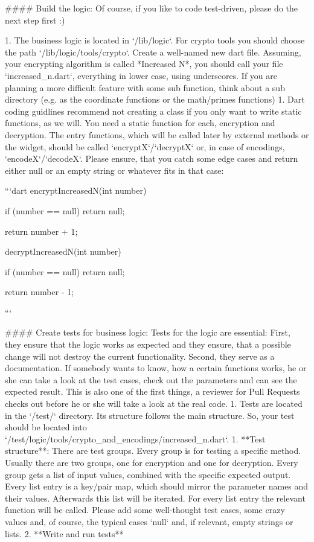 #### Build the logic:
Of course, if you like to code test-driven, please do the next step first :)

1. The business logic is located in `/lib/logic`. For crypto tools you should choose the path `/lib/logic/tools/crypto`. Create a well-named new dart file. Assuming, your encrypting algorithm is called *Increased N*, you should call your file `increased_n.dart`, everything in lower case, using underscores. If you are planning a more difficult feature with some sub function, think about a sub directory (e.g. as the coordinate functions or the math/primes functions) 
1. Dart coding guidlines recommend not creating a class if you only want to write static functions, as we will. You need a static function for each, encryption and decryption. The entry functions, which will be called later by external methods or the widget, should be called `encryptX`/`decryptX` or, in case of encodings, `encodeX`/`decodeX`. Please ensure, that you catch some edge cases and return either null or an empty string or whatever fits in that case:

```dart
encryptIncreasedN(int number) {
  if (number == null)
    return null;
  
  return number + 1;
}

decryptIncreasedN(int number) {
  if (number == null)
    return null;

  return number - 1;
}
```

#### Create tests for business logic:
Tests for the logic are essential: First, they ensure that the logic works as expected and they ensure, that a possible change will not destroy the current functionality. Second, they serve as a documentation. If somebody wants to know, how a certain functions works, he or she can take a look at the test cases, check out the parameters and can see the expected result. This is also one of the first things, a reviewer for Pull Requests checks out before he or she will take a look at the real code.
1. Tests are located in the `/test/` directory. Its structure follows the main structure. So, your test should be located into `/test/logic/tools/crypto_and_encodings/increased_n.dart`.
1. **Test structure**: There are test groups. Every group is for testing a specific method. Usually there are two groups, one for encryption and one for decryption. Every group gets a list of input values, combined with the specific expected output.  Every list entry is a key/pair map, which should mirror the parameter names and their values. Afterwards this list will be iterated. For every list entry the relevant function will be called. Please add some well-thought test cases, some crazy values and, of course, the typical cases `null` and, if relevant, empty strings or lists.
2. **Write and run tests**

